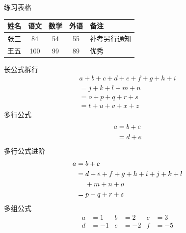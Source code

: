 \documentclass[12pt]{article}
\begin{document}
			\begin{center}
				练习表格 \\
				\begin{tabular}{|l|c|c|c|p{3cm}|}
					\hline
					姓名 & 语文 & 数学 & 外语 & 备注 \\
					\hline
					张三 & 84 & 54 & 55 & 补考另行通知 \\
					\hline
					王五 & 100 & 99 &89 & 优秀 \\
					\hline
				\end{tabular} 
			\end{center}
			
			\begin{center}
				长公式拆行
				\begin{multline}
					a + b + c + d + e + f
					+ g + h + i \\
					= j + k + l + m + n\\
					= o + p + q + r + s\\
					= t + u + v + x + z
				\end{multline}
				多行公式
				\begin{align}
					a & = b + c \notag \\
					& = d + e
				\end{align}
				多行公式进阶
				\begin{align}
					a ={} & b + c \\
					={} & d + e + f + g + h + i + j + k + l \notag \\
					& + m + n + o \\
					={} & p + q + r + s
				\end{align}
				多组公式
				\begin{align}
					a &=1 & b &=2 & c &=3 \\
					d &=-1 & e &=-2 & f &=-5
				\end{align}
			\end{center}
			
			
				
				
				
				
			
\end{document}
